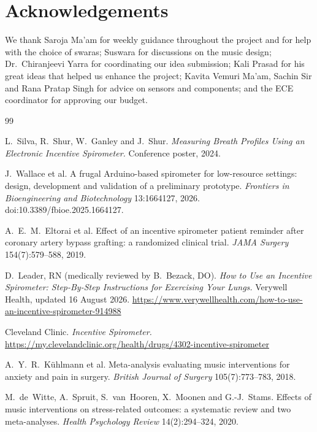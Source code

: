 \documentclass[12pt,a4paper]{article}
\begin{document}
\section*{Acknowledgements}
We thank Saroja Ma'am for weekly guidance throughout the project and for help with the choice of swaras; Suswara for discussions on the music design; Dr.\ Chiranjeevi Yarra for coordinating our idea submission; Kali Prasad for his great ideas that helped us enhance the project; Kavita Vemuri Ma'am, Sachin Sir and Rana Pratap Singh for advice on sensors and components; and the ECE coordinator for approving our budget.

\begin{thebibliography}{99}
\footnotesize
\setlength{\itemsep}{0pt}

 L.~Silva, R.~Shur, W.~Ganley and J.~Shur. \textit{Measuring Breath Profiles Using an Electronic Incentive Spirometer.} Conference poster, 2024.

 J.~Wallace et al. A frugal Arduino-based spirometer for low-resource settings: design, development and validation of a preliminary prototype. \textit{Frontiers in Bioengineering and Biotechnology} 13:1664127, 2026. doi:10.3389/fbioe.2025.1664127.

 A.~E.~M.~Eltorai et al. Effect of an incentive spirometer patient reminder after coronary artery bypass grafting: a randomized clinical trial. \textit{JAMA Surgery} 154(7):579--588, 2019.

 D.~Leader, RN (medically reviewed by B.~Bezack, DO). \textit{How to Use an Incentive Spirometer: Step-By-Step Instructions for Exercising Your Lungs.} Verywell Health, updated 16 August 2026. \url{https://www.verywellhealth.com/how-to-use-an-incentive-spirometer-914988}

 Cleveland Clinic. \textit{Incentive Spirometer.} \url{https://my.clevelandclinic.org/health/drugs/4302-incentive-spirometer}

 A.~Y.~R.~K\"uhlmann et al. Meta-analysis evaluating music interventions for anxiety and pain in surgery. \textit{British Journal of Surgery} 105(7):773--783, 2018.

 M.~de~Witte, A.~Spruit, S.~van~Hooren, X.~Moonen and G.-J.~Stams. Effects of music interventions on stress-related outcomes: a systematic review and two meta-analyses. \textit{Health Psychology Review} 14(2):294--324, 2020.


\end{thebibliography}
\end{document}
